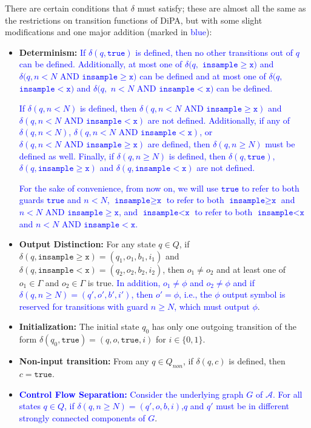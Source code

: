 \documentclass[12pt]{article}
\newcommand{\gguard}{\texttt{insample}\geq \texttt{x}}
\newcommand{\lguard}{\texttt{insample} < \texttt{x}}
\newcommand{\gaguard}{n<N \text{ AND } \texttt{insample} \geq \texttt{x}}
\newcommand{\laguard}{n<N\text{ AND }\texttt{insample} < \texttt{x}}
\theoremstyle{definition}
\begin{document}
There are certain conditions that $\delta$ must satisfy; these are almost all the same as the restrictions on transition functions of DiPA, but with some slight modifications and one major addition (marked in \textcolor{blue}{blue}):
\begin{itemize}
	\item \textbf{Determinism:} 
	\textcolor{blue}{If $\delta(q, \texttt{true})$ is defined, then no other transitions out of $q$ can be defined. Additionally, at most one of $\delta(q,$ $\gguard)$ and }\\
	\textcolor{blue}{$\delta(q,$$\gaguard)$ can be defined and at most one of $\delta(q,$ $\lguard)$ and $\delta(q,$ $\laguard)$ can be defined.} 
	
	\textcolor{blue}{If $\delta(q, n<N)$ is defined, then $\delta(q, \gaguard)$ and\\$\delta(q, \laguard)$ are not defined. Additionally, if any of $\delta(q, n<N)$, $\delta(q, \laguard)$, or $\delta(q, \gaguard)$ are defined, then $\delta(q, n \geq N)$ must be defined as well. 
	Finally, if $\delta(q, n\geq N)$ is defined, then $\delta(q, \texttt{true})$, $\delta(q, \gguard)$ and $\delta(q, \lguard)$ are not defined.} 

	\textcolor{blue}{For the sake of convenience, from now on, we will use $\texttt{true}$ to refer to both guards $\texttt{true}$ and $n < N$, $\gguard$ to refer to both $\gguard$ and $\gaguard$, and $\lguard$ to refer to both $\lguard$ and $\laguard$.}

	\item \textbf{Output Distinction:} For any state $q\in Q$, if $\delta(q, \gguard) = (q_1, o_1, b_1, i_1)$ and $\delta(q, \lguard) = (q_2, o_2, b_2, i_2)$, then $o_1\neq o_2$ and at least one of $o_1\in \Gamma$ and $o_2\in \Gamma$ is true. \textcolor{blue}{In addition, $o_1\neq \phi$ and $o_2\neq \phi$ and if $\delta(q, n\geq N) = (q', o', b', i')$, then $o' = \phi$, i.e., the $\phi$ output symbol is reserved for transitions with guard $n\geq N$, which must output $\phi$}.

	\item \textbf{Initialization:} The initial state $q_0$ has only one outgoing transition of the form $\delta(q_0, \texttt{true}) = (q, o, \texttt{true}, i)$ for $i\in \{0, 1\}$.

	\item \textbf{Non-input transition:} From any $q\in Q_{non}$, if $\delta(q, c)$ is defined, then $c=\texttt{true}$.

	\item \textcolor{blue}{\textbf{Control Flow Separation:} Consider the underlying graph $G$ of $\mathcal{A}$. For all states $q\in Q$, if $\delta(q, n\geq N) = (q', o, b, i)$,$q$ and $q'$ must be in different strongly connected components of $G$}.

\end{itemize}
\end{document}
